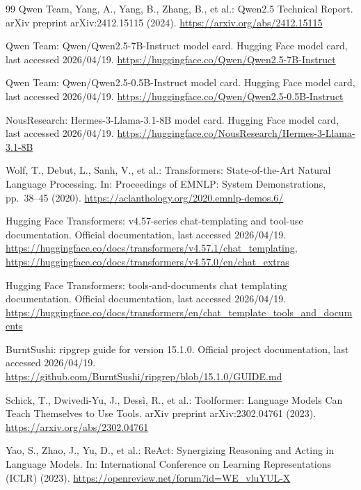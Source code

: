 \documentclass[runningheads]{llncs}
\begin{document}
\begin{thebibliography}{99}
Qwen Team, Yang, A., Yang, B., Zhang, B., et al.: Qwen2.5 Technical Report. arXiv preprint arXiv:2412.15115 (2024). \url{https://arxiv.org/abs/2412.15115}

Qwen Team: Qwen/Qwen2.5-7B-Instruct model card. Hugging Face model card, last accessed 2026/04/19. \url{https://huggingface.co/Qwen/Qwen2.5-7B-Instruct}

Qwen Team: Qwen/Qwen2.5-0.5B-Instruct model card. Hugging Face model card, last accessed 2026/04/19. \url{https://huggingface.co/Qwen/Qwen2.5-0.5B-Instruct}

NousResearch: Hermes-3-Llama-3.1-8B model card. Hugging Face model card, last accessed 2026/04/19. \url{https://huggingface.co/NousResearch/Hermes-3-Llama-3.1-8B}

Wolf, T., Debut, L., Sanh, V., et al.: Transformers: State-of-the-Art Natural Language Processing. In: Proceedings of EMNLP: System Demonstrations, pp.~38--45 (2020). \url{https://aclanthology.org/2020.emnlp-demos.6/}

Hugging Face Transformers: v4.57-series chat-templating and tool-use documentation. Official documentation, last accessed 2026/04/19. \url{https://huggingface.co/docs/transformers/v4.57.1/chat_templating}, \url{https://huggingface.co/docs/transformers/v4.57.0/en/chat_extras}

Hugging Face Transformers: tools-and-documents chat templating documentation. Official documentation, last accessed 2026/04/19. \url{https://huggingface.co/docs/transformers/en/chat_template_tools_and_documents}

BurntSushi: ripgrep guide for version 15.1.0. Official project documentation, last accessed 2026/04/19. \url{https://github.com/BurntSushi/ripgrep/blob/15.1.0/GUIDE.md}

Schick, T., Dwivedi-Yu, J., Dess\`i, R., et al.: Toolformer: Language Models Can Teach Themselves to Use Tools. arXiv preprint arXiv:2302.04761 (2023). \url{https://arxiv.org/abs/2302.04761}

Yao, S., Zhao, J., Yu, D., et al.: ReAct: Synergizing Reasoning and Acting in Language Models. In: International Conference on Learning Representations (ICLR) (2023). \url{https://openreview.net/forum?id=WE_vluYUL-X}


\end{thebibliography}
\end{document}
